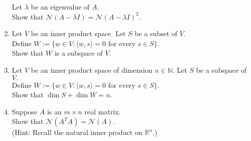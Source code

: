 \documentclass{article}
\begin{document}
\begin{enumerate}
	Let $\lambda$ be an eigenvalue of $A.$\\
	Show that $\mathcal{N}(A - \lambda I) = \mathcal{N}(A - \lambda I)^2.$
	\item Let $V$ be an inner product space. Let $S$ be a subset of $V.$\\
	Define $W := \{w \in V : \langle w, s\rangle = 0 \text{ for every } s \in S\}.$\\
	Show that $W$ is a subspace of $V.$
	\item Let $V$ be an inner product space of dimension $n \in \mathbb{N}.$ Let $S$ be a subspace of $V.$\\
	Define $W := \{w \in V : \langle w, s\rangle = 0 \text{ for every } s \in S\}.$\\
	Show that $\dim S + \dim W = n.$
	\item Suppose $A$ is an $m \times n$ real matrix.\\
	Show that $\mathcal{N}(A^TA) = \mathcal{N}(A).$\\
	(Hint: Recall the natural inner product on $\mathbb{R}^n.$)
\end{enumerate}
\end{document}
